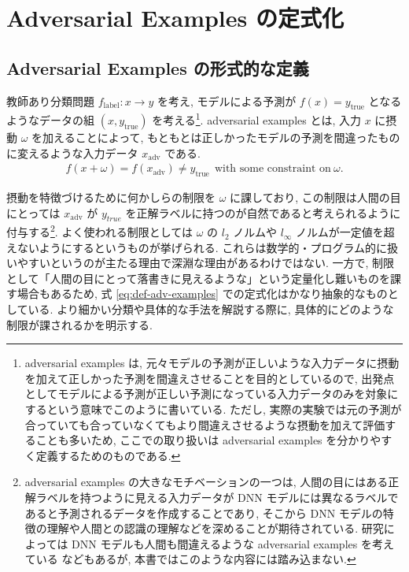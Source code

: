 \section{Adversarial Examples の定式化}
\label{sec:formulation}



\subsection{Adversarial Examples の形式的な定義}
\label{subsec:def-adv-examples}
教師あり分類問題 $f_{\text{label}}: x \rightarrow y$ を考え, モデルによる予測が $f(x) = y_{\text{true}}$ となるようなデータの組 $(x, y_{\text{true}})$ を考える\footnote{
adversarial examples は, 元々モデルの予測が正しいような入力データに摂動を加えて正しかった予測を間違えさせることを目的としているので, 出発点としてモデルによる予測が正しい予測になっている入力データのみを対象にするという意味でこのように書いている.
ただし, 実際の実験では元の予測が合っていても合っていなくてもより間違えさせるような摂動を加えて評価することも多いため, ここでの取り扱いは adversarial examples を分かりやすく定義するためのものである.
}.
adversarial examples とは, 入力 $x$ に摂動 $\omega$ を加えることによって, もともとは正しかったモデルの予測を間違ったものに変えるような入力データ $x_{\text{adv}}$ である.
%
\begin{eqnarray}
f(x + \omega) = f(x_{\text{adv}}) \neq y_{\text{true}} \ \ \text{with some constraint on} \ \omega.
\label{eq:def-adv-examples}
\end{eqnarray}
%

摂動を特徴づけるために何かしらの制限を $\omega$ に課しており, この制限は人間の目にとっては $x_{\text{adv}}$ が $y_{true}$ を正解ラベルに持つのが自然であると考えられるように付与する\footnote{
adversarial examples の大きなモチベーションの一つは, 人間の目にはある正解ラベルを持つように見える入力データが DNN モデルには異なるラベルであると予測されるデータを作成することであり, そこから DNN モデルの特徴の理解や人間との認識の理解などを深めることが期待されている.
研究によっては DNN モデルも人間も間違えるような adversarial examples を考えている \cite{elsayed2018adversarial} などもあるが, 本書ではこのような内容には踏み込まない.
}.
よく使われる制限としては $\omega$ の $l_2$ ノルムや $l_\infty$ ノルムが一定値を超えないようにするというものが挙げられる.
これらは数学的・プログラム的に扱いやすいというのが主たる理由で深淵な理由があるわけではない.
一方で, 制限として「人間の目にとって落書きに見えるような」という定量化し難いものを課す場合もあるため, 式 \ref{eq:def-adv-examples} での定式化はかなり抽象的なものとしている.
より細かい分類や具体的な手法を解説する際に, 具体的にどのような制限が課されるかを明示する.

